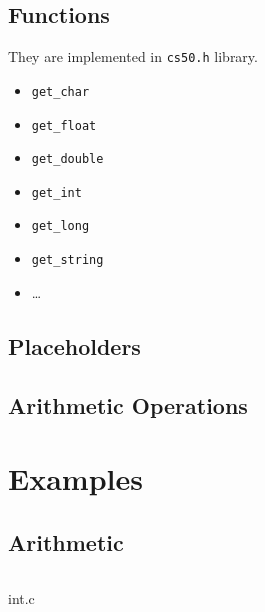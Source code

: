 \subsection{Functions}
They are implemented in \texttt{cs50.h} library.
\begin{itemize}
	\item \texttt{get_char}
	\item \texttt{get_float}
	\item \texttt{get_double}
	\item \texttt{get_int}
	\item \texttt{get_long}
	\item \texttt{get_string}
	\item \dots
\end{itemize}

\subsection{Placeholders}
\begin{itemize}
	\item \texttt{%
	\item \texttt{%
	\item \texttt{%
	\item \texttt{%
	\item \texttt{%
\end{itemize}

\subsection{Arithmetic Operations}
\begin{itemize}
	\item \texttt{+}
	\item \texttt{-}
	\item \texttt{*}
	\item \texttt{/}
	\item \texttt{%
\end{itemize}


\section{Examples}
\subsection{Arithmetic}
\begin{code}[ht!]
	\inputminted[linenos]{c}{codes/int.c}
	\caption{int.c}
\end{code}

